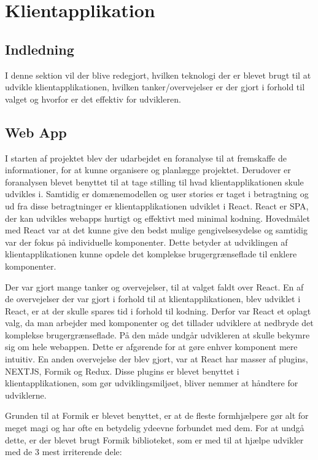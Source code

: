\chapter{Klientapplikation}

\section{Indledning}
I denne sektion vil der blive redegjort, hvilken teknologi der er blevet brugt til at udvikle klientapplikationen, hvilken tanker/overvejelser er der gjort i forhold til valget og hvorfor er det effektiv for udvikleren.

\section{Web App}
I starten af projektet blev der udarbejdet en foranalyse til at fremskaffe de informationer, for at kunne organisere og planlægge projektet. Derudover er foranalysen blevet benyttet til at tage stilling til hvad klientapplikationen skule udvikles i. Samtidig er domænemodellen og user stories er taget i betragtning og ud fra disse betragtninger er klientapplikationen udviklet i React. React er SPA, der kan udvikles webapps hurtigt og effektivt med minimal kodning. Hovedmålet med React var at det kunne give den bedst mulige gengivelsesydelse og samtidig var der fokus på individuelle komponenter. Dette betyder at udviklingen af klientapplikationen kunne opdele det komplekse brugergrænseflade til enklere komponenter. 

Der var gjort mange tanker og overvejelser, til at valget faldt over React. En af de overvejelser der var gjort i forhold til at klientapplikationen, blev udviklet i React, er at der skulle spares tid i forhold til kodning. Derfor var React et oplagt valg, da man arbejder med komponenter og det tillader udviklere at nedbryde det komplekse brugergrænseflade. På den måde undgår udvikleren at skulle bekymre sig om hele webappen. Dette er afgørende for at gøre enhver komponent mere intuitiv. En anden overvejelse der blev gjort, var at React har masser af plugins, NEXTJS, Formik og Redux. Disse plugins er blevet benyttet i klientapplikationen, som gør udviklingsmiljøet, bliver nemmer at håndtere for udviklerne. 

Grunden til at Formik er blevet benyttet, er at de fleste formhjælpere gør alt for meget magi og har ofte en betydelig ydeevne forbundet med dem. For at undgå dette, er der blevet brugt Formik biblioteket, som er med til at hjælpe udvikler med de 3 mest irriterende dele:

